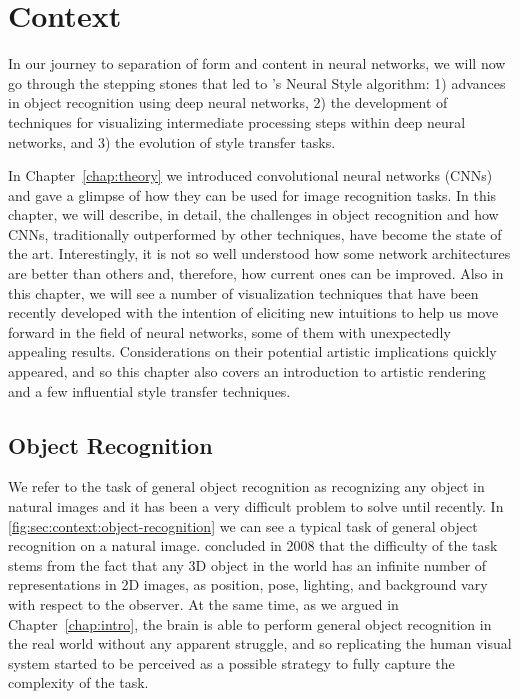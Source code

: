 
\chapter{Context}
\label{chap:context}




In our journey to separation of form and content in neural networks, we will now go through the stepping stones that led to \citeauthor{Gatys2015B}'s Neural Style algorithm: 1) advances in object recognition using deep neural networks, 2) the development of techniques for visualizing intermediate processing steps within deep neural networks, and 3) the evolution of style transfer tasks.

In Chapter~\ref{chap:theory} we introduced convolutional neural networks (CNNs) and gave a glimpse of how they can be used for image recognition tasks.
In this chapter, we will describe, in detail, the challenges in object recognition and how CNNs, traditionally outperformed by other techniques, have become the state of the art.
Interestingly, it is not so well understood how some network architectures are better than others and, therefore, how current ones can be improved.
Also in this chapter, we will see a number of visualization techniques that have been recently developed with the intention of eliciting new intuitions to help us move forward in the field of neural networks, some of them with unexpectedly appealing results.
Considerations on their potential artistic implications quickly appeared, and so this chapter also covers an introduction to artistic rendering and a few influential style transfer techniques.



\section{Object Recognition}
\label{sec:context:object-recognition}

We refer to the task of general object recognition as recognizing any object in natural images and it has been a very difficult problem to solve until recently.
In \autoref{fig:sec:context:object-recognition} we can see a typical task of general object recognition on a natural image.
\citet{Pinto2008} concluded in 2008 that the difficulty of the task stems from the fact that any 3D object in the world has an infinite number of representations in 2D images, as position, pose, lighting, and background vary with respect to the observer.
At the same time, as we argued in Chapter~\ref{chap:intro}, the brain is able to perform general object recognition in the real world without any apparent struggle, and so replicating the human visual system started to be perceived as a possible strategy to fully capture the complexity of the task.

